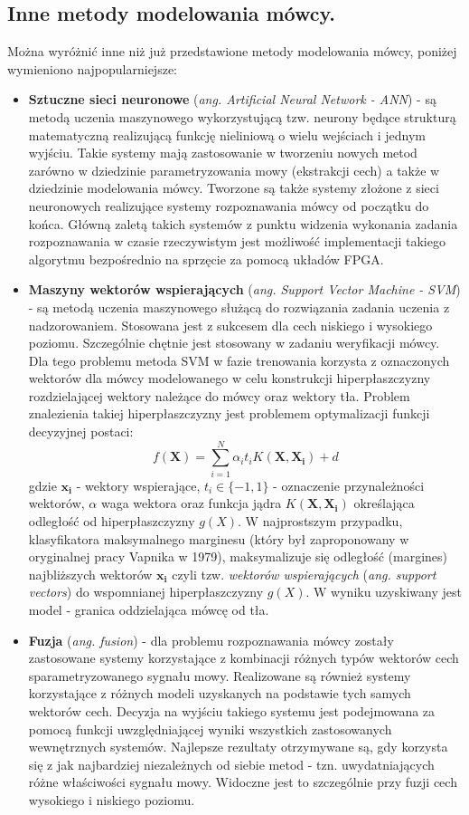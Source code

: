 \subsection{Inne metody modelowania mówcy.}
Można wyróżnić inne niż już przedstawione metody modelowania mówcy, poniżej wymieniono najpopularniejsze:
\begin{itemize}
  \item{\textbf{Sztuczne sieci neuronowe} (\textit{ang. Artificial Neural Network - ANN})} - są metodą uczenia maszynowego wykorzystującą tzw. neurony będące strukturą matematyczną realizującą funkcję nieliniową o wielu wejściach i jednym wyjściu. Takie systemy mają zastosowanie w tworzeniu nowych metod zarówno w dziedzinie parametryzowania mowy (ekstrakcji cech) a także w dziedzinie modelowania mówcy. Tworzone są także systemy złożone z sieci neuronowych realizujące systemy rozpoznawania mówcy od początku do końca. Główną zaletą takich systemów z punktu widzenia wykonania zadania rozpoznawania w czasie rzeczywistym jest możliwość implementacji takiego algorytmu bezpośrednio na sprzęcie za pomocą układów FPGA.
  \item{\textbf{Maszyny wektorów wspierających} (\textit{ang. Support Vector Machine - SVM}) \label{svm}} - są metodą uczenia maszynowego służącą do rozwiązania zadania uczenia z nadzorowaniem. Stosowana jest z sukcesem dla cech niskiego i wysokiego poziomu. Szczególnie chętnie jest stosowany w zadaniu weryfikacji mówcy. Dla tego problemu metoda SVM w fazie trenowania korzysta z oznaczonych wektorów dla mówcy modelowanego w celu konstrukcji hiperpłaszczyzny rozdzielającej wektory należące do mówcy oraz wektory tła. Problem znalezienia takiej hiperpłaszczyzny jest problemem optymalizacji funkcji decyzyjnej postaci:
\begin{equation}
  f(\bm{X}) =\sum^N_{i=1}\alpha_it_iK(\bm{X},\bm{X_i}) + d
\end{equation}
    gdzie $\bm{x_i}$ - wektory wspierające, $t_i \in \{-1,1\}$ - oznaczenie przynależności wektorów, $\alpha$ waga wektora oraz funkcja jądra $K(\bm{X},\bm{X_i})$ określająca odległość od hiperpłaszczyzny $g(X)$.
    W najprostszym przypadku, klasyfikatora maksymalnego marginesu (który był zaproponowany w oryginalnej pracy Vapnika w 1979),  maksymalizuje się odległość (margines) najbliższych wektorów $\bm{x_i}$ czyli tzw. \textit{wektorów wspierających}  (\textit{ang. support vectors}) do wspomnianej hiperpłaszczyzny  $g(X)$. W wyniku uzyskiwany jest model - granica oddzielająca mówcę od tła.
  \item{\textbf{Fuzja} (\textit{ang. fusion})} - dla problemu rozpoznawania mówcy zostały zastosowane systemy korzystające z kombinacji różnych typów wektorów cech sparametryzowanego sygnału mowy. Realizowane są również systemy korzystające z różnych modeli uzyskanych na podstawie tych samych wektorów cech. Decyzja na wyjściu takiego systemu jest podejmowana za pomocą funkcji uwzględniającej wyniki wszystkich zastosowanych wewnętrznych systemów. Najlepsze rezultaty otrzymywane
      są, gdy korzysta się
      z jak najbardziej niezależnych od siebie metod - tzn. uwydatniających różne właściwości sygnału mowy. Widoczne jest to szczególnie przy fuzji cech wysokiego i niskiego poziomu.
\end{itemize}
